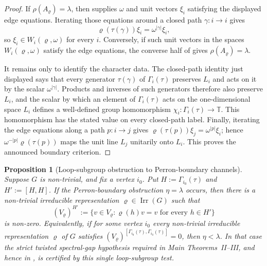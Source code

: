 \documentclass[11pt,a4paper]{amsart}
\theoremstyle{plain}
\newtheorem{proposition}[theorem]{Proposition}
\theoremstyle{definition}
\theoremstyle{remark}
\DeclareMathOperator{\Irr}{Irr}
\newcommand{\TT}{\mathbb{T}}
\begin{document}
\begin{proof}
  If \(\rho(A_\varrho)=\lambda\), then
   supplies \(\omega\) and unit vectors
  \(\xi_i\) satisfying the displayed edge equations. Iterating those
  equations around a closed path \(\gamma:i\to i\) gives
  \[
    \varrho(\tau(\gamma))\xi_i=\omega^{|\gamma|}\xi_i,
  \]
  so \(\xi_i\in W_i(\varrho,\omega)\) for every \(i\). Conversely, if such
  unit vectors in the spaces \(W_i(\varrho,\omega)\) satisfy the edge
  equations, the converse half of  gives
  \(\rho(A_\varrho)=\lambda\).

  It remains only to identify the character data. The closed-path identity
  just displayed says that every generator \(\tau(\gamma)\) of
  \(\Gamma_i(\tau)\) preserves \(L_i\) and acts on it by the scalar
  \(\omega^{|\gamma|}\). Products and inverses of such generators therefore
  also preserve \(L_i\), and the scalar by which an element of
  \(\Gamma_i(\tau)\) acts on the one-dimensional space \(L_i\) defines a
  well-defined group homomorphism \(\chi_i:\Gamma_i(\tau)\to\TT\). This
  homomorphism has the stated value on every closed-path label. Finally,
  iterating the edge equations along a path \(p:i\to j\) gives
  \(\varrho(\tau(p))\xi_j=\omega^{|p|}\xi_i\); hence
  \(\omega^{-|p|}\varrho(\tau(p))\) maps the unit line \(L_j\) unitarily
  onto \(L_i\). This proves the announced boundary criterion.
\end{proof}

\begin{proposition}[Loop-subgroup obstruction to Perron-boundary channels]
  \label{prop:eta-gap-loop-subgroup-obstruction}
  Suppose \(G\) is non-trivial, and fix a vertex \(i_0\).  Put
  \(H:=\Gamma_{i_0}(\tau)\) and \(H':=[H,H]\).  If the Perron-boundary
  obstruction \(\eta=\lambda\) occurs, then there is a non-trivial
  irreducible representation \(\varrho\in\Irr(G)\) such that
  \[
    (V_\varrho)^{H'}
    :=
    \{v\in V_\varrho:\varrho(h)v=v\text{ for every }h\in H'\}
  \]
  is non-zero.  Equivalently, if for some vertex \(i_0\) every
  non-trivial irreducible representation \(\varrho\) of \(G\) satisfies
  \((V_\varrho)^{[\Gamma_{i_0}(\tau),\Gamma_{i_0}(\tau)]}=0\), then
  \(\eta<\lambda\).  In that case the strict twisted spectral-gap
  hypothesis required in Main Theorems~II--III, and hence in
  , is
  certified by this single loop-subgroup test.
\end{proposition}
\end{document}
